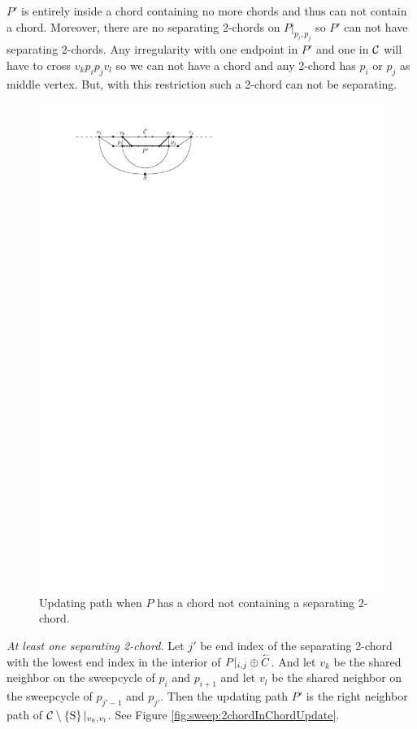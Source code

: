       $P'$ is entirely inside a chord containing no more chords and thus can not contain a chord. Moreover, there are no separating $2$-chords on $P|_{p_i, p_j}$ so $P'$ can not have separating $2$-chords. Any irregularity with one endpoint in $P'$ and one in $\mathcal{C}$ will have to cross $v_k p_i p_j v_l$ so we can not have a chord and any 2-chord has $p_i$ or $p_j$ as middle vertex. But, with this restriction such a 2-chord can not be separating.

      \begin{figure}[h]
        \centering
        \includegraphics[scale=1]{unifiedAlgo/img/sweep/cases/chordUpdate}
        \caption{Updating path when $P$ has a chord not containing a separating 2-chord.}
        \label{fig:sweep:chordUpdate}
      \end{figure}

    \emph{At least one separating 2-chord.}
      Let $j'$ be end index of the separating 2-chord with the lowest end index in the interior of $P|_{i, j} \oplus \accentset{\leftharpoonup}{{C}}$. And let $v_k$ be the shared neighbor on the sweepcycle of $p_{i}$ and $p_{i +1}$ and let $v_l$ be the shared neighbor on the sweepcycle  of $p_{j' -1}$ and $p_{j'}$.
      Then the updating path $P'$ is the right neighbor path of $\mathcal{C} \setminus \left\lbrace {\mathrm{S}} \right\rbrace|_{v_k, v_l}$. See Figure \ref{fig:sweep:2chordInChordUpdate}.

